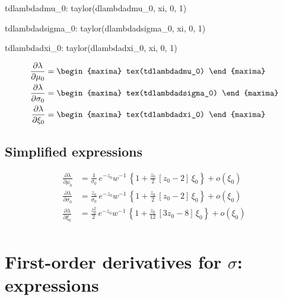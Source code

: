\begin{maxima}
  tdlambdadmu_0: taylor(dlambdadmu_0, xi, 0, 1)
\end{maxima}
\begin{maxima}
  tdlambdadsigma_0: taylor(dlambdadsigma_0, xi, 0, 1)
\end{maxima}
\begin{maxima}
  tdlambdadxi_0: taylor(dlambdadxi_0, xi, 0, 1)
\end{maxima}

{\color{MonVertF} \footnotesize
\begin{align*}
  \frac{\partial{\lambda}}{\partial \mu_0}
  &=
\begin{maxima}
  tex(tdlambdadmu_0)
\end{maxima}\\
 \frac{\partial{\lambda}}{\partial \sigma_0}
  &=
\begin{maxima}
  tex(tdlambdadsigma_0)
\end{maxima}\\
 \frac{\partial{\lambda}}{\partial \xi_0}
  &=
\begin{maxima}
  tex(tdlambdadxi_0)
\end{maxima}
\end{align*}
}

\subsection*{Simplified expressions}

{\color{red} 
\begin{align*}
  \frac{\partial{\lambda}}{\partial \mu_0}
  &= \frac{1}{\sigma_0} \, e^{-z_0} w^{-1} \,
    \left\{ 1 + \frac{z_0}{2} \,
    \left[z_0 - 2\right] \, \xi_0 \right\} + o(\xi_0)
  \\
 \frac{\partial{\lambda}}{\partial \sigma_0}
  &= \frac{z_0}{\sigma_0} \, e^{-z_0} w^{-1} \,
    \left\{ 1 + \frac{z_0}{2} \,
    \left[z_0 - 2\right] \, \xi_0 \right\} + o(\xi_0)
  \\
 \frac{\partial{\lambda}}{\partial \xi_0}
  &= \frac{z_0^2}{2} \, e^{-z_0} w^{-1} \,
     \left\{ 1 + \frac{z_0}{12} \,
    \left[3 z_0 - 8\right] \, \xi_0 \right\} + o(\xi_0)
  \\
\end{align*}
}

\section{First-order derivatives for $\sigma$: expressions}

